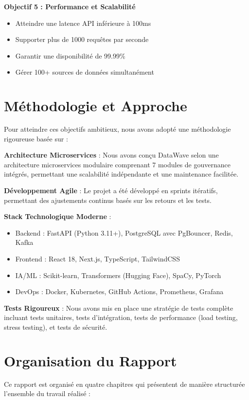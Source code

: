 \textbf{Objectif 5 : Performance et Scalabilité}
\begin{itemize}
    \item Atteindre une latence API inférieure à 100ms
    \item Supporter plus de 1000 requêtes par seconde
    \item Garantir une disponibilité de 99.99\%
    \item Gérer 100+ sources de données simultanément
\end{itemize}

\section*{Méthodologie et Approche}

Pour atteindre ces objectifs ambitieux, nous avons adopté une méthodologie rigoureuse basée sur :

\textbf{Architecture Microservices} : Nous avons conçu DataWave selon une architecture microservices modulaire comprenant 7 modules de gouvernance intégrés, permettant une scalabilité indépendante et une maintenance facilitée.

\textbf{Développement Agile} : Le projet a été développé en sprints itératifs, permettant des ajustements continus basés sur les retours et les tests.

\textbf{Stack Technologique Moderne} :
\begin{itemize}
    \item Backend : FastAPI (Python 3.11+), PostgreSQL avec PgBouncer, Redis, Kafka
    \item Frontend : React 18, Next.js, TypeScript, TailwindCSS
    \item IA/ML : Scikit-learn, Transformers (Hugging Face), SpaCy, PyTorch
    \item DevOps : Docker, Kubernetes, GitHub Actions, Prometheus, Grafana
\end{itemize}

\textbf{Tests Rigoureux} : Nous avons mis en place une stratégie de tests complète incluant tests unitaires, tests d'intégration, tests de performance (load testing, stress testing), et tests de sécurité.

\section*{Organisation du Rapport}

Ce rapport est organisé en quatre chapitres qui présentent de manière structurée l'ensemble du travail réalisé :

